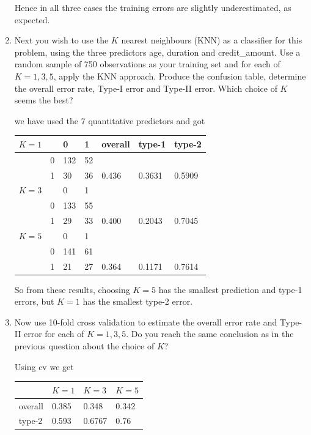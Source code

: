 \documentclass[11pt]{article}
\begin{document}
\begin{enumerate}
    Hence in all three cases the training errors are slightly underestimated, as expected.
    

    
  \item Next you wish to use the $K$ nearest neighbours (KNN) as a classifier for this problem, using the three predictors age, duration and credit\_amount. Use a random sample of 750 observations as your training set and for each of $K=1,3,5$, apply the KNN approach. Produce the confusion table, determine the overall error rate, Type-I error and Type-II error. Which choice of $K$ seems the best?

     we have used the 7 quantitative predictors and got

\begin{center}
    \begin{tabular}{| llll | lll |}
    \hline
      $K=1$&&0 & 1& overall & type-1 &type-2 \\
      \hline
            & 0& 132&  52&&&\\
            & 1&  30 & 36&0.436 &0.3631 &0.5909\\
      \hline
      $K=3$ &&0 &1&&&\\
      \hline
            & 0& 133&  55&&&\\
      & 1 & 29 & 33& 0.400 & 0.2043& 0.7045\\
      \hline
      $K=5$ &&0 &1&&&\\
      \hline
           & 0 &141 & 61&&&\\
      & 1 & 21 & 27& 0.364 &  0.1171 & 0.7614 \\
      \hline
    \end{tabular}
    \end{center}

    So from these results, choosing $K=5$ has the smallest prediction and type-1 errors, but $K=1$ has the smallest type-2 error.
    
  \item Now use 10-fold cross validation to estimate the overall error rate and Type-II error for each of $K=1,3,5$. Do you reach the same conclusion as in the previous question about the choice of $K$?

     Using cv we get

    \begin{tabular}{llll}
      &$K=1$ & $K=3$ & $K=5$ \\
      \hline
overall&  0.385  & 0.348 &  0.342 \\
type-2 & 0.593 & 0.6767  & 0.76 \\
\hline
    \end{tabular}



\end{enumerate}
\end{document}
